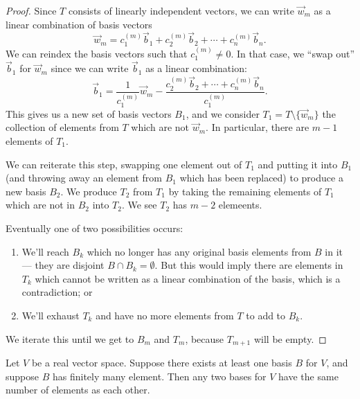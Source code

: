 \begin{proof}
Since $T$ consists of linearly independent vectors, we can write
$\vec{w}_{m}$ as a linear combination of basis vectors
\begin{equation}
\vec{w}_{m} = c^{(m)}_{1}\vec{b}_{1}+c^{(m)}_{2}\vec{b}_{2}+\cdots+c^{(m)}_{n}\vec{b}_{n}.
\end{equation}
We can reindex the basis vectors such that $c^{(m)}_{1}\neq0$. In that
case, we ``swap out'' $\vec{b}_{1}$ for $\vec{w}_{m}$ since we can write
$\vec{b}_{1}$ as a linear combination:
\begin{equation}
\vec{b}_{1}=\frac{1}{c^{(m)}_{1}}\vec{w}_{m} - \frac{c^{(m)}_{2}\vec{b}_{2}+\cdots+c^{(m)}_{n}\vec{b}_{n}}{c^{(m)}_{1}}.
\end{equation}
This gives us a new set of basis vectors $B_{1}$, and we consider $T_{1}=T\setminus\{\vec{w}_{m}\}$
the collection of elements from $T$ which are not $\vec{w}_{m}$. In
particular, there are $m-1$ elements of $T_{1}$.

We can reiterate this step, swapping one element out of $T_{1}$ and
putting it into $B_{1}$ (and throwing away an element from $B_{1}$ which
has been replaced) to produce a new basis $B_{2}$. We produce $T_{2}$
from $T_{1}$ by taking the remaining elements of $T_{1}$ which are not
in $B_{2}$ into $T_{2}$. We see $T_{2}$ has $m-2$ elemeents.

Eventually one of two possibilities occurs:
\begin{enumerate}
\item We'll reach $B_{k}$ which no longer has any original basis
  elements from $B$ in it --- they are disjoint $B\cap B_{k}=\emptyset$.
  But this would imply there are elements in $T_{k}$ which cannot be
  written as a linear combination of the basis, which is a
  contradiction; or
\item We'll exhaust $T_{k}$ and have no more elements from $T$ to add to $B_{k}$.
\end{enumerate}
We iterate this until we get to $B_{m}$ and $T_{m}$, because $T_{m+1}$
will be empty.
\end{proof}

\begin{theorem}
Let $V$ be a real vector space. Suppose there exists at least one basis
$B$ for $V$, and suppose $B$ has finitely many element. 
Then any two bases for $V$ have the same number of elements as each other.
\end{theorem}

